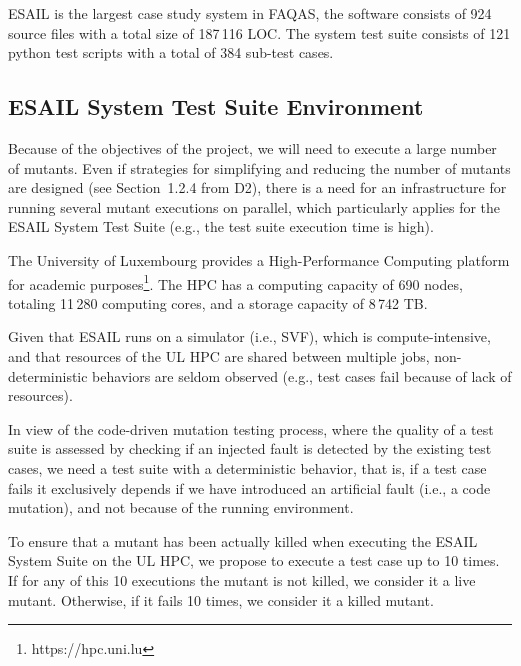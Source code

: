 
ESAIL is the largest case study system in FAQAS, the software consists of 924 source files with a total size of 187\,116 LOC. The system test suite consists of 121 python test scripts with a total of 384 sub-test cases. 

\subsection{ESAIL System Test Suite Environment}

Because of the objectives of the project, we will need to execute a large number of mutants. Even if strategies for simplifying and reducing the number of mutants are designed (see Section~1.2.4 from D2), there is a need for an infrastructure for running several mutant executions on parallel, which particularly applies for the ESAIL System Test Suite (e.g., the test suite execution time is high).

The University of Luxembourg provides a High-Performance Computing platform for academic purposes\footnote{https://hpc.uni.lu}.
The HPC has a computing capacity of 690 nodes, totaling 11\,280 computing cores, and a storage capacity of 8\,742 TB.

Given that ESAIL runs on a simulator (i.e., SVF), which is compute-intensive, and that resources of the UL HPC are shared between multiple jobs, non-deterministic behaviors are seldom observed (e.g., test cases fail because of lack of resources).

In view of the code-driven mutation testing process, where the quality of a test suite is assessed by checking if an injected fault is detected by the existing test cases, we need a test suite with a deterministic behavior, that is, if a test case fails it exclusively depends if we have introduced an artificial fault (i.e., a code mutation), and not because of the running environment.

To ensure that a mutant has been actually killed when executing the ESAIL System Suite on the UL HPC, we propose to execute a test case up to 10 times. If for any of this 10 executions the mutant is not killed, we consider it a live mutant. Otherwise, if it fails 10 times, we consider it a killed mutant.



